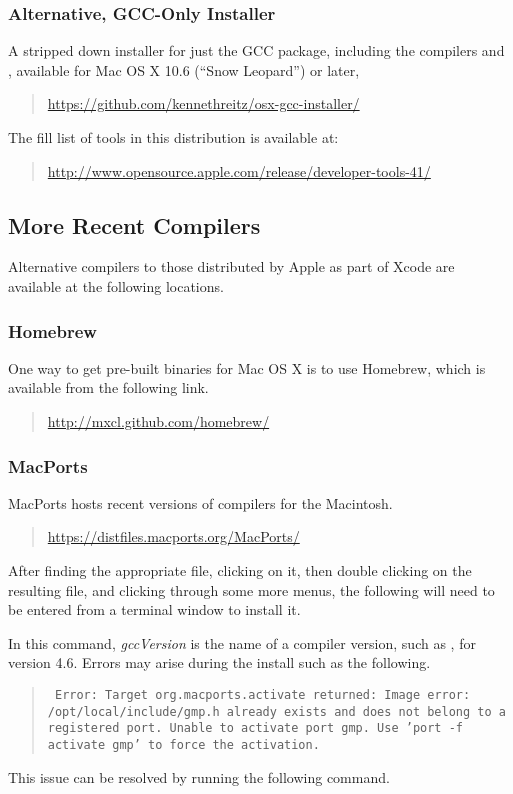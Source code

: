 \subsubsection{Alternative, GCC-Only Installer}

A stripped down installer for just the GCC package, including the \Cpp
compilers  and , available for Mac OS X 10.6
(``Snow Leopard'') or later,
%
\begin{quote}
\url{https://github.com/kennethreitz/osx-gcc-installer/}
\end{quote}
%
The fill list of tools in this distribution is available at:
%
\begin{quote}
\url{http://www.opensource.apple.com/release/developer-tools-41/}
\end{quote}


\subsection{More Recent Compilers}

Alternative compilers to those distributed by Apple as part of Xcode
are available at the following locations.

\subsubsection{Homebrew}

One way to get pre-built binaries for Mac OS X is to use Homebrew,
which is available from the following link.
\begin{quote}
\url{http://mxcl.github.com/homebrew/}
\end{quote}

\subsubsection{MacPorts}

MacPorts hosts recent versions of compilers for the Macintosh.
%
\begin{quote}
\url{https://distfiles.macports.org/MacPorts/}
\end{quote}
%
After finding the appropriate  file, clicking on it, then
double clicking on the resulting  file, and clicking
through some more menus, the following will need to be entered from a
terminal window to install it.
%
\begin{quote}
\end{quote}
%
In this command, {\slshape gccVersion} is the name of a compiler
version, such as , for version 4.6.  Errors may arise
during the install such as the following.
%
\begin{quote}\small\tt
  Error: Target org.macports.activate returned: Image error:
  /opt/local/include/gmp.h already exists and does not belong to a
  registered port.  Unable to activate port gmp. Use 'port -f activate
  gmp' to force the activation.
\end{quote}
%
This issue can be resolved by running the following command.
%
\begin{quote}
\end{quote}
%

